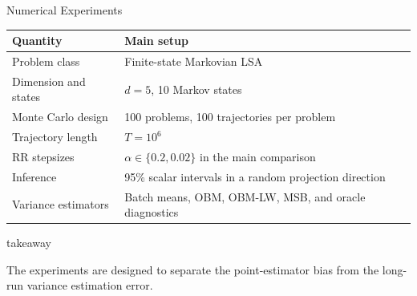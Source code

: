 \documentclass[11pt,aspectratio=169,xcolor=table]{beamer}
\newenvironment{takeawaybox}
  {\begin{beamercolorbox}[wd=\linewidth,sep=0.52em,leftskip=0.25em,rightskip=0.25em,rounded=true]{takeaway}%
   \begin{minipage}{0.96\linewidth}%
   \llap{{\color{ThesisGreen}\rule{2.5pt}{2.6ex}}\hspace{0.5em}}}
  {\end{minipage}\end{beamercolorbox}}
\begin{document}
\begin{frame}[shrink=5]{Numerical Experiments}
\small
\renewcommand{\arraystretch}{1.18}
\begin{center}
\begin{tabular}{|p{}|p{}|}
  \hline
  \rowcolor{PaleBlue}\textbf{Quantity} & \textbf{Main setup}\\ \hline
  Problem class & Finite-state Markovian LSA\\ \hline
  Dimension and states & $d=5$, 10 Markov states\\ \hline
  Monte Carlo design & 100 problems, 100 trajectories per problem\\ \hline
  Trajectory length & $T=10^6$\\ \hline
  RR stepsizes & $\alpha\in\{0.2,0.02\}$ in the main comparison\\ \hline
  Inference & 95\% scalar intervals in a random projection direction\\ \hline
  Variance estimators & Batch means, OBM, OBM-LW, MSB, and oracle diagnostics\\ \hline
\end{tabular}
\end{center}

\vspace{0.4em}
\begin{takeawaybox}
The experiments are designed to separate the point-estimator bias from the
long-run variance estimation error.
\end{takeawaybox}
\end{frame}
\end{document}
